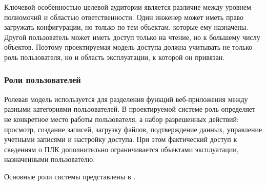 Ключевой особенностью целевой аудитории является различие между уровнем
полномочий и областью ответственности. Один инженер может иметь право загружать
конфигурации, но только по тем объектам, которые ему назначены. Другой
пользователь может иметь доступ только на чтение, но к большему числу объектов.
Поэтому проектируемая модель доступа должна учитывать не только роль
пользователя, но и область эксплуатации, к которой он привязан.


\subsubsection{Роли пользователей}

Ролевая модель используется для разделения функций веб-приложения между разными категориями пользователей. В проектируемой системе роль определяет не конкретное место работы пользователя, а набор разрешенных действий: просмотр, создание записей, загрузку файлов, подтверждение данных, управление учетными записями и настройку доступа. При этом фактический доступ к сведениям о ПЛК дополнительно ограничивается объектами эксплуатации, назначенными пользователю.

Основные роли системы представлены в .

